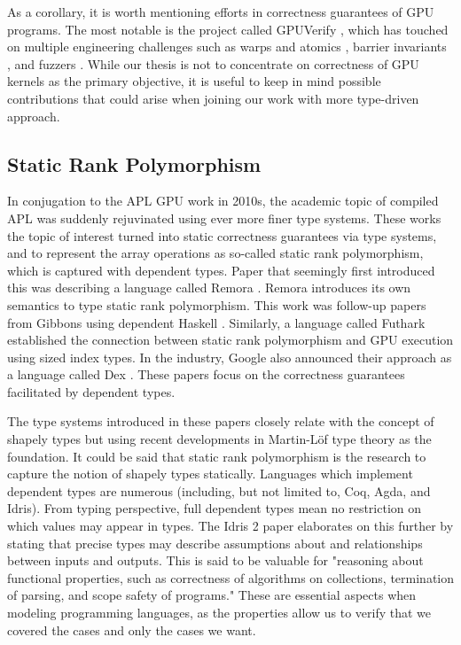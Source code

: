 \documentclass[10pt,a4paper]{article}
\begin{document}
As a corollary, it is worth mentioning efforts in correctness guarantees of GPU programs.
The most notable is the project called GPUVerify \cite{GpuverifyBetts2012}, which has touched on multiple engineering challenges such as warps and atomics \cite{WarpsAndAtomiBardsl2014}, barrier invariants \cite{BarrierInvariaChong2013}, and fuzzers \cite{TestCaseReducDonald2021}.
While our thesis is not to concentrate on correctness of GPU kernels as the primary objective, it is useful to keep in mind possible contributions that could arise when joining our work with more type-driven approach.

\subsection{Static Rank Polymorphism}

In conjugation to the APL GPU work in 2010s, the academic topic of compiled APL was suddenly rejuvinated using ever more finer type systems.
These works the topic of interest turned into static correctness guarantees via type systems, and to represent the array operations as so-called static rank polymorphism, which is captured with dependent types.
Paper that seemingly first introduced this was describing a language called Remora \cite{IntroductionToShiver2019}.
Remora introduces its own semantics to type static rank polymorphism.
This work was follow-up papers from Gibbons using dependent Haskell \cite{AplicativeProgGibbon2017}.
Similarly, a language called Futhark \cite{FutharkPurelyHenrik2017} \cite{AplOnGpusAHenrik2016}  \cite{TowardsSizeDeHenrik2021} established the connection between static rank polymorphism and GPU execution using sized index types.
In the industry, Google also announced their approach as a language called Dex \cite{GettingToThePaszke2021}.
These papers focus on the correctness guarantees facilitated by dependent types.

The type systems introduced in these papers closely relate with the concept of shapely types \cite{ProgrammingInJayC1999} \cite{PolynomialSizeShkara2009} but using recent developments in Martin-Löf type theory as the foundation.
It could be said that static rank polymorphism is the research to capture the notion of shapely types statically.
Languages which implement dependent types are numerous (including, but not limited to, Coq, Agda, and Idris).
From typing perspective, full dependent types mean no restriction on which values may appear in types.
The Idris 2 paper \cite{Idris2QuantiBrady2021} elaborates on this further by stating that precise types may describe assumptions about and relationships between inputs and outputs.
This is said to be valuable for "reasoning about functional properties, such as correctness of algorithms on collections, termination of parsing, and scope safety of programs."
These are essential aspects when modeling programming languages, as the properties allow us to verify that we covered the cases and only the cases we want.
\end{document}
